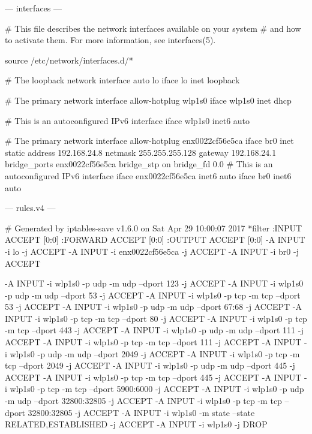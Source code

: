 \documentclass[mingoth,a4paper]{jsarticle}
\begin{document}
{{{{{{{{{{--- interfaces ---
\begin{commandline}
# This file describes the network interfaces available on your system
# and how to activate them. For more information, see interfaces(5).

source /etc/network/interfaces.d/*

# The loopback network interface
auto lo
iface lo inet loopback

# The primary network interface
allow-hotplug wlp1s0
iface  wlp1s0 inet dhcp

# This is an autoconfigured IPv6 interface
iface wlp1s0 inet6 auto

# The primary network interface
allow-hotplug enx0022cf56e5ca
iface br0 inet static
   address 192.168.24.8
   netmask 255.255.255.128
   gateway 192.168.24.1
   bridge_ports enx0022cf56e5ca
   bridge_stp on
   bridge_fd 0.0
# This is an autoconfigured IPv6 interface
iface enx0022cf56e5ca inet6 auto
iface br0 inet6 auto
\end{commandline}
\clearpage

--- rules.v4 ---
\begin{commandline}
# Generated by iptables-save v1.6.0 on Sat Apr 29 10:00:07 2017
*filter
:INPUT ACCEPT [0:0]
:FORWARD ACCEPT [0:0]
:OUTPUT ACCEPT [0:0]
-A INPUT -i lo -j ACCEPT
-A INPUT -i enx0022cf56e5ca -j ACCEPT
-A INPUT -i br0 -j ACCEPT

-A INPUT -i wlp1s0 -p udp -m udp --dport 123 -j ACCEPT
-A INPUT -i wlp1s0 -p udp -m udp --dport 53 -j ACCEPT
-A INPUT -i wlp1s0 -p tcp -m tcp --dport 53 -j ACCEPT
-A INPUT -i wlp1s0 -p udp -m udp --dport 67:68 -j ACCEPT
-A INPUT -i wlp1s0 -p tcp -m tcp --dport 80 -j ACCEPT
-A INPUT -i wlp1s0 -p tcp -m tcp --dport 443 -j ACCEPT
-A INPUT -i wlp1s0 -p udp -m udp --dport 111 -j ACCEPT
-A INPUT -i wlp1s0 -p tcp -m tcp --dport 111 -j ACCEPT
-A INPUT -i wlp1s0 -p udp -m udp --dport 2049 -j ACCEPT
-A INPUT -i wlp1s0 -p tcp -m tcp --dport 2049 -j ACCEPT
-A INPUT -i wlp1s0 -p udp -m udp --dport 445 -j ACCEPT
-A INPUT -i wlp1s0 -p tcp -m tcp --dport 445 -j ACCEPT
-A INPUT -i wlp1s0 -p tcp -m tcp --dport 5900:6000 -j ACCEPT
-A INPUT -i wlp1s0 -p udp -m udp --dport 32800:32805 -j ACCEPT
-A INPUT -i wlp1s0 -p tcp -m tcp --dport 32800:32805 -j ACCEPT
-A INPUT -i wlp1s0 -m state --state RELATED,ESTABLISHED -j ACCEPT
-A INPUT -i wlp1s0 -j DROP



\end{commandline}}}}}}}}}}}
\end{document}

